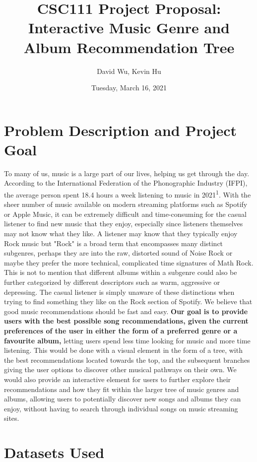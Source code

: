 \documentclass[fontsize=11pt]{article}
\title{CSC111 Project Proposal: Interactive Music Genre and Album Recommendation Tree}
\author{David Wu, Kevin Hu}
\date{Tuesday, March 16, 2021}
\begin{document}
\maketitle

\section*{Problem Description and Project Goal}

To many of us, music is a large part of our lives, helping us get through the day. According to the International Federation of the Phonographic Industry (IFPI), the average person spent 18.4 hours a week listening to music in 2021\textsuperscript{1}. With the sheer number of music available on modern streaming platforms such as Spotify or Apple Music, it can be extremely difficult and time-consuming for the casual listener to find new music that they enjoy, especially since listeners themselves may not know what they like. A listener may know that they typically enjoy Rock music but "Rock" is a broad term that encompasses many distinct subgenres, perhaps they are into the raw, distorted sound of Noise Rock or maybe they prefer the more technical, complicated time signatures of Math Rock. This is not to mention that different albums within a subgenre could also be further categorized by different descriptors such as warm, aggressive or depressing. The casual listener is simply unaware of these distinctions when trying to find something they like on the Rock section of Spotify. We believe that good music recommendations should be fast and easy. \textbf{Our goal is to provide users with the best possible song recommendations, given the current preferences of the user in either the form of a preferred genre or a favourite album,} letting users spend less time looking for music and more time listening. This would be done with a visual element in the form of a tree, with the best recommendations located towards the top, and the subsequent branches giving the user options to discover other musical pathways on their own. We would also provide an interactive element for users to further explore their recommendations and how they fit within the larger tree of music genres and albums, allowing users to potentially discover new songs and albums they can enjoy, without having to search through individual songs on music streaming sites.



\section*{Datasets Used}
\end{document}
